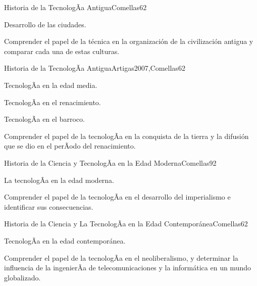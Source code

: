 \begin{syllabus}
\begin{unit}{Historia de la TecnologÃ­a Antigua}{Comellas}{6}{2}
\begin{topics}
    \item Desarrollo de las ciudades.
\end{topics}
\begin{unitgoals}
    \item Comprender el papel de la técnica en la organización de la civilización antigua y comparar cada una de estas culturas.
\end{unitgoals}
\end{unit}

\begin{unit}{Historia de la TecnologÃ­a Antigua}{Artigas2007,Comellas}{6}{2}
\begin{topics}
    \item TecnologÃ­a en la edad media.
    \item TecnologÃ­a en el renacimiento.
    \item TecnologÃ­a en el barroco.
\end{topics}
\begin{unitgoals}
    \item Comprender el  papel de la tecnologÃ­a en la conquista de la tierra y la difusión que se dio en el perÃ­odo del renacimiento.
\end{unitgoals}

\end{unit}

\begin{unit}{Historia de la Ciencia y TecnologÃ­a en la Edad Moderna}{Comellas}{9}{2}
\begin{topics}
      \item {La tecnologÃ­a en la edad moderna.}
\end{topics}
\begin{unitgoals}
	\item Comprender el  papel de la tecnologÃ­a en el desarrollo del imperialismo e identificar sus consecuencias.
\end{unitgoals}
\end{unit}

\begin{unit}{Historia de la Ciencia y La TecnologÃ­a en la Edad Contemporánea}{Comellas}{6}{2}
\begin{topics}
      \item {TecnologÃ­a en la edad contemporánea.}
\end{topics}
\begin{unitgoals}
	\item Comprender el  papel de la tecnologÃ­a en el neoliberalismo, y determinar la influencia de la ingenierÃ­a de telecomunicaciones y la informática en un mundo globalizado.
\end{unitgoals}
\end{unit}


\end{syllabus}
